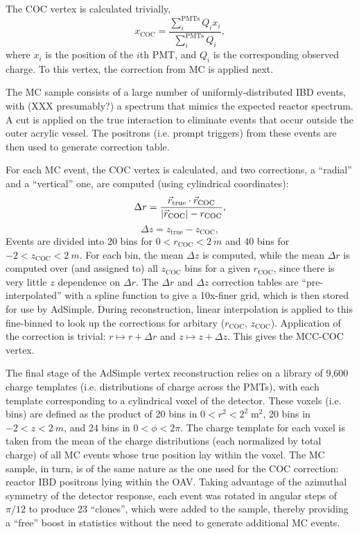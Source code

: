 \documentclass[../thesis.tex]{subfiles}
\begin{document}
The COC vertex is calculated trivially,
\begin{equation*}
  x_{\mathrm{COC}} = \frac{\sum_{i}^{\mathrm{PMTs}} Q_i x_i}{\sum_i^{\mathrm{PMTs}} Q_i},
\end{equation*}
where $x_i$ is the position of the $i$th PMT, and $Q_i$ is the corresponding
observed charge. To this vertex, the correction from MC is applied next.

The MC sample consists of a large number of uniformly-distributed IBD events,
with (XXX presumably?) a spectrum that mimics the expected reactor spectrum. A
cut is applied on the true interaction to eliminate events that occur outside
the outer acrylic vessel. The positrons (i.e. prompt triggers) from these events
are then used to generate correction table.

For each MC event, the COC vertex is calculated, and two corrections, a
``radial'' and a ``vertical'' one, are computed (using cylindrical coordinates):
\begin{equation*}
  \Delta r = \frac{\vec{r}_{\mathrm{true}} \cdot \vec{r}_{\mathrm{COC}}}{\lvert \vec{r}_{\mathrm{COC}}\rvert - r_{\mathrm{COC}}},
\end{equation*}
\begin{equation*}
  \Delta z = z_{\mathrm{true}} - z_{\mathrm{COC}},
\end{equation*}
Events are divided into 20 bins for $0 < r_{\mathrm{COC}} < \SI{2}{m}$ and 40
bins for $-2 < z_{\mathrm{COC}} < \SI{2}{m}$. For each bin, the mean $\Delta z$
is computed, while the mean $\Delta r$ is computed over (and assigned to) all
$z{_\mathrm{COC}}$ bins for a given $r_{\mathrm{COC}}$, since there is very
little $z$ dependence on $\Delta r$. The $\Delta r$ and $\Delta z$ correction
tables are ``pre-interpolated'' with a spline function to give a 10x-finer grid,
which is then stored for use by AdSimple. During reconstruction, linear
interpolation is applied to this fine-binned to look up the corrections for
arbitary ($r_{\mathrm{COC}}$, $z_{\mathrm{COC}}$). Application of the correction
is trivial: $r \mapsto r + \Delta r$ and $z \mapsto z + \Delta z$. This gives
the MCC-COC vertex.

The final stage of the AdSimple vertex reconstruction relies on a library of
9,600 charge templates (i.e. distributions of charge across the PMTs), with each
template corresponding to a cylindrical voxel of the detector. These voxels
(i.e. bins) are defined as the product of 20 bins in $0 < r^2 <
2^2\;\mathrm{m}^2$, 20 bins in $-2 < z < \SI{2}{m}$, and 24 bins in $0 < \phi <
2\pi$. The charge template for each voxel is taken from the mean of the charge
distributions (each normalized by total charge) of all MC events whose true
position lay within the voxel. The MC sample, in turn, is of the same nature as
the one used for the COC correction: reactor IBD positrons lying within the
OAV. Taking advantage of the azimuthal symmetry of the detector response, each
event was rotated in angular steps of $\pi/12$ to produce 23 ``clones'', which
were added to the sample, thereby providing a ``free'' boost in statistics
without the need to generate additional MC events.
\end{document}

